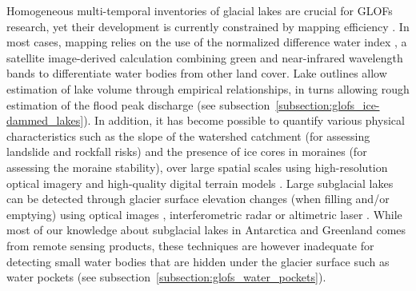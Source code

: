 Homogeneous multi-temporal inventories of glacial lakes are crucial for GLOFs research, yet their development is currently constrained by mapping efficiency \citep{Zhang&al2024}. In most cases, mapping relies on the use of the normalized difference water index \citep{McFeeters1996}, a satellite image-derived calculation combining green and near-infrared wavelength bands to differentiate water bodies from other land cover. Lake outlines allow estimation of lake volume through empirical relationships, in turns allowing rough estimation of the flood peak discharge (see subsection~\ref{subsection:glofs_ice-dammed_lakes}). In addition, it has become possible to quantify various physical characteristics such as the slope of the watershed catchment (for assessing landslide and rockfall risks) and the presence of ice cores in moraines (for assessing the moraine stability), over large spatial scales using high-resolution optical imagery and high-quality digital terrain models \citep[e.g.][]{Rounce&al2016,Allen&al2019,Dubey&al2020}. Large subglacial lakes can be detected through glacier surface elevation changes (when filling and/or emptying) using optical images \citep[e.g.][]{livingstone&al2019}, interferometric radar \citep[e.g.][]{Capps&al2010} or altimetric laser \citep[e.g][]{Siegfried&al2021}. While most of our knowledge about subglacial lakes in Antarctica and Greenland comes from remote sensing products, these techniques are however inadequate for detecting small water bodies that are hidden under the glacier surface such as water pockets (see subsection~\ref{subsection:glofs_water_pockets}).


